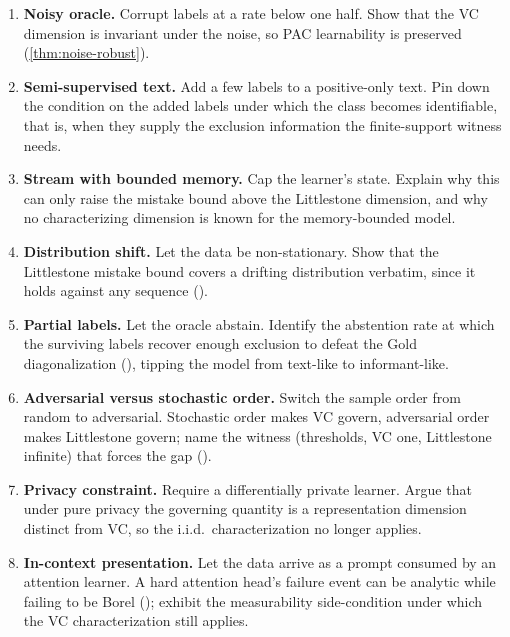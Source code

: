 \begin{enumerate}[leftmargin=*,itemsep=3pt]
\item \textbf{Noisy oracle.} Corrupt labels at a rate below one half. Show that the VC dimension is invariant under the noise, so PAC learnability is preserved (\cref{thm:noise-robust}).
\item \textbf{Semi-supervised text.} Add a few labels to a positive-only text. Pin down the condition on the added labels under which the class becomes identifiable, that is, when they supply the exclusion information the finite-support witness needs.
\item \textbf{Stream with bounded memory.} Cap the learner's state. Explain why this can only raise the mistake bound above the Littlestone dimension, and why no characterizing dimension is known for the memory-bounded model.
\item \textbf{Distribution shift.} Let the data be non-stationary. Show that the Littlestone mistake bound covers a drifting distribution verbatim, since it holds against any sequence ().
\item \textbf{Partial labels.} Let the oracle abstain. Identify the abstention rate at which the surviving labels recover enough exclusion to defeat the Gold diagonalization (), tipping the model from text-like to informant-like.
\item \textbf{Adversarial versus stochastic order.} Switch the sample order from random to adversarial. Stochastic order makes VC govern, adversarial order makes Littlestone govern; name the witness (thresholds, VC one, Littlestone infinite) that forces the gap ().
\item \textbf{Privacy constraint.} Require a differentially private learner. Argue that under pure privacy the governing quantity is a representation dimension distinct from VC, so the i.i.d.\ characterization no longer applies.
\item \textbf{In-context presentation.} Let the data arrive as a prompt consumed by an attention learner. A hard attention head's failure event can be analytic while failing to be Borel (); exhibit the measurability side-condition under which the VC characterization still applies.
\end{enumerate}

